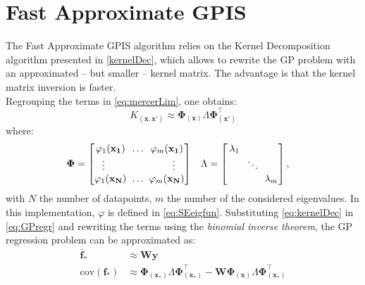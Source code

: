 \documentclass[10pt,a4paper,twocolumn]{article}
\newcommand{\trsp}{{\scriptscriptstyle\top}}
\newcommand{\cov}{\mathrm{cov}}
\begin{document}
\section{Fast Approximate GPIS}	
The Fast Approximate GPIS algorithm relies on the Kernel Decomposition algorithm presented in \autoref{kernelDec}, which allows to rewrite the GP problem with an approximated -- but smaller -- kernel matrix. The advantage is that the kernel matrix inversion is faster.\\
Regrouping the terms in \autoref{eq:mercerLim}, one obtains:
\begin{equation}\label{eq:kernelDec}
	K_{(\mathbf{x}, \mathbf{x'})} \approx \mathbf{\Phi}_{(\mathbf{x})} \Lambda \mathbf{\Phi}_{(\mathbf{x'})}^\trsp
\end{equation}
where:
\begin{align}
	\mathbf{\Phi} &=
	\begin{bmatrix}
		\varphi_1(\mathbf{x_1}) \hspace{-5mm} && \ldots && \hspace{-5mm} \varphi_m(\mathbf{x_1}) \\
		\vdots && && \vdots \\
		\varphi_1(\mathbf{x_N}) \hspace{-5mm} && \ldots && \hspace{-5mm} \varphi_m(\mathbf{x_N})
	\end{bmatrix}
	&&
	\Lambda = 
	\begin{bmatrix}
		\lambda_1 \hspace{-5mm}&& && \\
		&& \ddots && \\
		&& && \hspace{-5mm} \lambda_m
	\end{bmatrix},
\end{align}
with $N$ the number of datapoints, $m$ the number of the considered eigenvalues. In this implementation, $\varphi$ is defined in \autoref{eq:SEeigfun}.
Substituting \autoref{eq:kernelDec} in \autoref{eq:GPregr} and rewriting the terms using the \textit{binomial inverse theorem}, the GP regression problem can be approximated as:
\begin{equation}
	\begin{aligned}
		\mathbf{\bar{f}_*} &\approx \mathbf{W}\mathbf{y}\\    
		\cov(\mathbf{f}_*) &\approx \mathbf{\Phi}_{(\mathbf{x}_*)} \Lambda \mathbf{\Phi}_{(\mathbf{x}_*)}^\trsp - \mathbf{W} \mathbf{\Phi}_{(\mathbf{x})} \Lambda \mathbf{\Phi}_{(\mathbf{x}_*)}^\trsp
	\end{aligned}
\end{equation}
\end{document}
